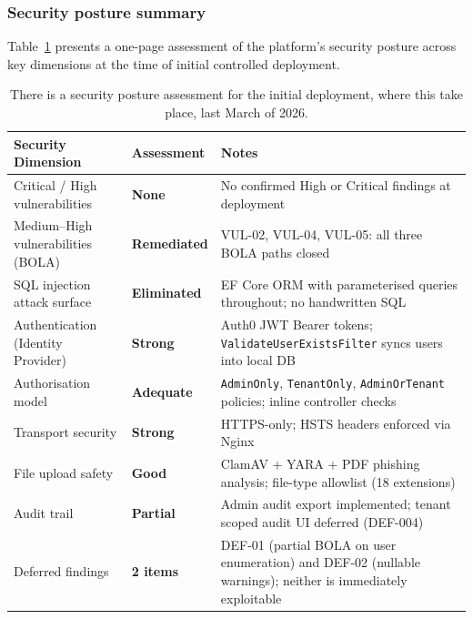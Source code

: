\subsubsection{Security posture summary}

Table~\ref{tab:security-posture} presents a one-page assessment of the platform's security posture across key dimensions at the time of initial controlled deployment.

\begin{table}[H]
  \vspace{2ex}
  \centering
  \footnotesize
  {%
  \setlength{\tabcolsep}{5pt}
  \renewcommand{\arraystretch}{1.3}
  \begin{tabular}{|>{\raggedright\arraybackslash}p{}|
                  >{\centering\arraybackslash}p{}|
                  >{\raggedright\arraybackslash}p{}|}
    \hline
    \textbf{Security Dimension} & \textbf{Assessment} & \textbf{Notes} \\
    \hline\hline
    Critical / High vulnerabilities & \textbf{None} & No confirmed High or Critical findings at deployment \\
    \hline
    Medium--High vulnerabilities (BOLA) & \textbf{Remediated} & VUL-02, VUL-04, VUL-05: all three BOLA paths closed \\
    \hline
    SQL injection attack surface & \textbf{Eliminated} & EF Core ORM with parameterised queries throughout; no handwritten SQL \\
    \hline
    Authentication (Identity Provider) & \textbf{Strong} & Auth0 JWT Bearer tokens; \texttt{ValidateUserExistsFilter} syncs users into local DB \\
    \hline
    Authorisation model & \textbf{Adequate} & \texttt{AdminOnly}, \texttt{TenantOnly}, \texttt{AdminOrTenant} policies; inline controller checks \\
    \hline
    Transport security & \textbf{Strong} & HTTPS-only; HSTS headers enforced via Nginx \\
    \hline
    File upload safety & \textbf{Good} & ClamAV + YARA + PDF phishing analysis; file-type allowlist (18 extensions) \\
    \hline
    Audit trail & \textbf{Partial} & Admin audit export implemented; tenant scoped audit UI deferred (DEF-004) \\
    \hline
    Deferred findings & \textbf{2 items} & DEF-01 (partial BOLA on user enumeration) and DEF-02 (nullable warnings); neither is immediately exploitable \\
    \hline
  \end{tabular}
  }%
  \vspace{2ex}
  \captionsetup{type=table}
  \caption{There is a security posture assessment for the initial deployment, where this take place, last March of 2026.}
  \label{tab:security-posture}
\end{table}

